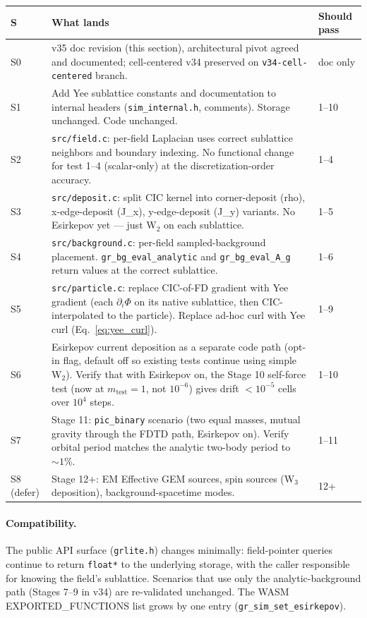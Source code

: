 \documentclass[11pt,a4paper]{article}
\begin{document}
\begin{center}
\begin{tabular}{@{}lL{8.5cm}L{2.5cm}@{}}
\toprule
\textbf{S} & \textbf{What lands} & \textbf{Should pass} \\
\midrule
S0 & v35 doc revision (this section), architectural pivot agreed and
documented; cell-centered v34 preserved on
\texttt{v34-cell-centered} branch. & doc only \\
S1 & Add Yee sublattice constants and documentation to internal
headers (\texttt{sim\_internal.h}, comments).  Storage unchanged.
Code unchanged. & 1--10 \\
S2 & \texttt{src/field.c}: per-field Laplacian uses correct
sublattice neighbors and boundary indexing.  No functional change for
test 1--4 (scalar-only) at the discretization-order accuracy. & 1--4 \\
S3 & \texttt{src/deposit.c}: split CIC kernel into corner-deposit
(rho), x-edge-deposit (J\_x), y-edge-deposit (J\_y) variants.  No
Esirkepov yet --- just W$_2$ on each sublattice. & 1--5 \\
S4 & \texttt{src/background.c}: per-field sampled-background placement.
\texttt{gr\_bg\_eval\_analytic} and \texttt{gr\_bg\_eval\_A\_g} return
values at the correct sublattice. & 1--6 \\
S5 & \texttt{src/particle.c}: replace CIC-of-FD gradient with Yee
gradient (each $\partial_i \Phi$ on its native sublattice, then
CIC-interpolated to the particle).  Replace ad-hoc curl with Yee
curl (Eq.~\ref{eq:yee_curl}). & 1--9 \\
S6 & Esirkepov current deposition as a separate code path (opt-in
flag, default off so existing tests continue using simple W$_2$).
Verify that with Esirkepov on, the Stage 10 self-force test (now at
$m_{\mathrm{test}} = 1$, not $10^{-6}$) gives drift $< 10^{-5}$ cells
over $10^4$ steps. & 1--10 \\
S7 & Stage 11: \texttt{pic\_binary} scenario (two equal masses,
mutual gravity through the FDTD path, Esirkepov on).  Verify orbital
period matches the analytic two-body period to $\sim 1\%$. & 1--11 \\
S8 (defer)
   & Stage 12+: EM Effective GEM sources, spin sources (W$_3$
   deposition), background-spacetime modes. & 12+ \\
\bottomrule
\end{tabular}
\end{center}

\paragraph{Compatibility.}  The public API surface
(\texttt{grlite.h}) changes minimally: field-pointer queries
continue to return \texttt{float*} to the underlying storage, with the
caller responsible for knowing the field's sublattice.  Scenarios
that use only the analytic-background path (Stages 7--9 in v34) are
re-validated unchanged.  The WASM EXPORTED\_FUNCTIONS list grows by
one entry (\texttt{gr\_sim\_set\_esirkepov}).
\end{document}
